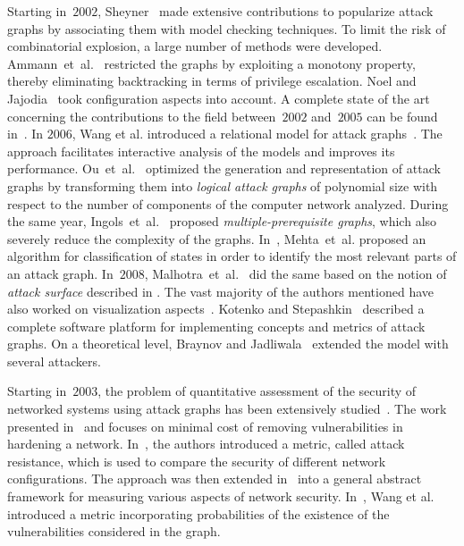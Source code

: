 \documentclass[a4paper]{article}
\begin{document}
Starting in~$2002$, Sheyner~\cite{ShHaJhLiWi,Shey} made extensive  contributions
 to popularize attack graphs by associating them with model checking techniques.
To limit the risk of combinatorial explosion, a large number of methods were 
developed. Ammann~et~al.~\cite{AmWiKa} restricted the graphs by exploiting a 
monotony property, thereby eliminating backtracking in terms of privilege 
escalation. Noel and Jajodia~\cite{NoJaObJa,JaNoOb} took configuration aspects 
into account.  A complete state of the art  concerning the contributions to the
field between~$2002$ and~$2005$ can be  found in~\cite{LiIn}. In $2006$, Wang et
al. introduced a relational model for attack  graphs~\cite{WaYaSiJa}.  The
approach facilitates interactive analysis of the models and improves its 
performance.  Ou~et~al.~\cite{OuBoQu} optimized the  generation and
representation of attack graphs by transforming them into  \emph{logical attack
graphs} of polynomial size with respect to the number of  components of the
computer network analyzed.  During the same year,  Ingols~et~al.~\cite{InLiPi}
proposed \emph{multiple-prerequisite graphs}, which  also severely reduce the
complexity of the graphs.   In~\cite{MeBaZhClWi}, Mehta~et~al. proposed an
algorithm  for classification of states in order to identify the most relevant 
parts of an attack graph. In~$2008$, Malhotra~et~al.~\cite{MaBaGh} did the same
based on the notion of \emph{attack surface} described in \cite{Mana}. The vast 
majority of the authors mentioned have also worked on visualization 
aspects~\cite{NoJa,NoJaKaJa,WiLiIn,HoVaOuQu}. Kotenko and 
Stepashkin~\cite{KoSt} described a complete software platform for implementing 
concepts and metrics of attack graphs. On a theoretical level, Braynov and 
Jadliwala~\cite{BrJa} extended the model with several attackers.

Starting in~$2003$, the problem of quantitative  assessment of the security of
networked systems using attack  graphs has been extensively 
studied~\cite{NoJaObJa,WaNoJa,WaSiJa2,WaSiJa,WaIsLoSiJa}.  The work presented
in~\cite{NoJaObJa} and \cite{WaNoJa}  focuses on minimal cost of removing
vulnerabilities in hardening a network.  In~\cite{WaSiJa2}, the authors
introduced a metric, called attack resistance, which is used to compare the
security of different network configurations.   The approach was then extended
in~\cite{WaSiJa} into a general abstract framework  for measuring various
aspects of network security.  In~\cite{WaIsLoSiJa}, Wang et al. introduced a
metric incorporating probabilities  of the existence of the vulnerabilities
considered in the graph.
\end{document}

